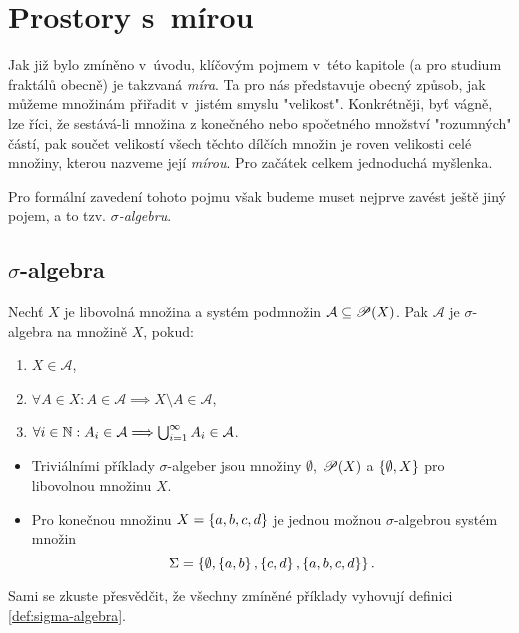 \section{Prostory s~mírou}\label{sec:prostory-s-mirou}

Jak již bylo zmíněno v~úvodu, klíčovým pojmem v~této kapitole (a pro studium fraktálů obecně) je takzvaná \emph{míra}. Ta pro nás představuje obecný způsob, jak můžeme množinám přiřadit v~jistém smyslu "velikost". Konkrétněji, byť vágně, lze říci, že sestává-li množina z konečného nebo spočetného množství "rozumných" částí, pak součet velikostí všech těchto dílčích množin je roven velikosti celé množiny, kterou nazveme její \emph{mírou}. Pro začátek celkem jednoduchá myšlenka.

Pro formální zavedení tohoto pojmu však budeme muset nejprve zavést ještě jiný pojem, a to tzv. \emph{$\sigma$-algebru}.

\subsection{$\sigma$-algebra}\label{subsec:sigma-algebra}

\begin{definition}\label{def:sigma-algebra}
    Nechť $X$ je libovolná množina a systém podmnožin $\mathcal{A}\subseteq\mathscr{P}(X)$. Pak $\mathcal{A}$ je $\sigma$-algebra na množině $X$, pokud:
    \begin{enumerate}[label=(\roman*)]
        \item\label{def:sigma-algebra-podm1} $X\in\mathcal{A}$,
        \item\label{def:sigma-algebra-podm2} $\forall A\in X: A\in\mathcal{A}\implies X\setminus A\in\mathcal{A}$,
        \item\label{def:sigma-algebra-podm3} $\forall i\in\mathbb{N}: A_i\in\mathcal{A}\Longrightarrow\bigcup_{i=1}^\infty A_i\in\mathcal{A}$.
    \end{enumerate}
\end{definition}

\begin{example}
    \begin{itemize}
        \item Triviálními příklady $\sigma$-algeber jsou množiny $\emptyset$, $\mathscr{P}(X)$ a $\left\{\emptyset,X\right\}$ pro libovolnou množinu $X$.
        \item Pro konečnou množinu $X=\left\{a,b,c,d\right\}$ je jednou možnou $\sigma$-algebrou systém množin
        \[\Sigma=\left\{\emptyset,\left\{a,b\right\},\left\{c,d\right\},\left\{a,b,c,d\right\}\right\}.\]
    \end{itemize}
    Sami se zkuste přesvědčit, že všechny zmíněné příklady vyhovují definici \ref{def:sigma-algebra}.
\end{example}

